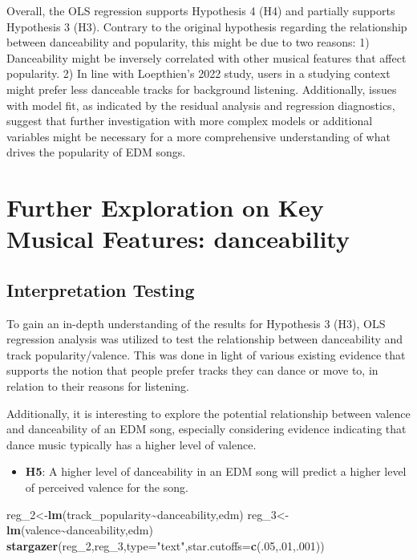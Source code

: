 \documentclass[
]{book}
\newenvironment{Shaded}{\begin{snugshade}}{\end{snugshade}}
\newcommand{\AttributeTok}[1]{\textcolor[rgb]{0.13,0.29,0.53}{#1}}
\newcommand{\DecValTok}[1]{\textcolor[rgb]{0.00,0.00,0.81}{#1}}
\newcommand{\FunctionTok}[1]{\textcolor[rgb]{0.13,0.29,0.53}{\textbf{#1}}}
\newcommand{\NormalTok}[1]{#1}
\newcommand{\OtherTok}[1]{\textcolor[rgb]{0.56,0.35,0.01}{#1}}
\newcommand{\SpecialCharTok}[1]{\textcolor[rgb]{0.81,0.36,0.00}{\textbf{#1}}}
\newcommand{\StringTok}[1]{\textcolor[rgb]{0.31,0.60,0.02}{#1}}
\providecommand{\tightlist}{%
  \setlength{\itemsep}{0pt}\setlength{\parskip}{0pt}}
\begin{document}
Overall, the OLS regression supports Hypothesis 4 (H4) and partially supports Hypothesis 3 (H3). Contrary to the original hypothesis regarding the relationship between danceability and popularity, this might be due to two reasons: 1) Danceability might be inversely correlated with other musical features that affect popularity. 2) In line with Loepthien's 2022 study, users in a studying context might prefer less danceable tracks for background listening. Additionally, issues with model fit, as indicated by the residual analysis and regression diagnostics, suggest that further investigation with more complex models or additional variables might be necessary for a more comprehensive understanding of what drives the popularity of EDM songs.

\hypertarget{further-exploration-on-key-musical-features-danceability}{%
\chapter{Further Exploration on Key Musical Features: danceability}\label{further-exploration-on-key-musical-features-danceability}}

\hypertarget{interpretation-testing}{%
\section{Interpretation Testing}\label{interpretation-testing}}

To gain an in-depth understanding of the results for Hypothesis 3 (H3), OLS regression analysis was utilized to test the relationship between danceability and track popularity/valence. This was done in light of various existing evidence that supports the notion that people prefer tracks they can dance or move to, in relation to their reasons for listening. \citep[e.g.,][]{duman2022music, loepthien2022flow}

Additionally, it is interesting to explore the potential relationship between valence and danceability of an EDM song, especially considering evidence indicating that dance music typically has a higher level of valence.

\begin{itemize}
\tightlist
\item
  \textbf{H5}: A higher level of danceability in an EDM song will predict a higher level of perceived valence for the song.
\end{itemize}

\begin{Shaded}
\begin{Highlighting}[]
\NormalTok{reg\_2}\OtherTok{\textless{}{-}}\FunctionTok{lm}\NormalTok{(track\_popularity}\SpecialCharTok{\textasciitilde{}}\NormalTok{danceability,edm)}
\NormalTok{reg\_3}\OtherTok{\textless{}{-}}\FunctionTok{lm}\NormalTok{(valence}\SpecialCharTok{\textasciitilde{}}\NormalTok{danceability,edm)}
\FunctionTok{stargazer}\NormalTok{(reg\_2,reg\_3,}\AttributeTok{type=}\StringTok{"text"}\NormalTok{,}\AttributeTok{star.cutoffs=}\FunctionTok{c}\NormalTok{(.}\DecValTok{05}\NormalTok{,.}\DecValTok{01}\NormalTok{,.}\DecValTok{001}\NormalTok{))}
\end{Highlighting}
\end{Shaded}
\end{document}

